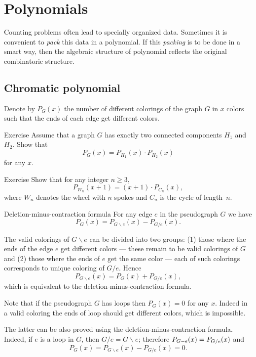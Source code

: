 \chapter{Polynomials}

Counting problems often lead to specially organized data.
Sometimes it is convenient to {}\emph{pack} this data in a polynomial.
If this {}\emph{packing} is to be done in a smart way, then the algebraic structure of polynomial reflects the original combinatoric structure.

\section*{Chromatic polynomial}

Denote by $P_G(x)$ the number of different colorings of the graph $G$ in $x$ colors such that the ends of each edge get different colors.

\begin{thm}{Exercise}
Assume that a graph $G$ has exactly two connected components $H_1$ and $H_2$.
Show that 
\[P_G(x)=P_{H_1}(x)\cdot P_{H_2}(x)\]
for any $x$.
\end{thm}

\begin{thm}{Exercise}
Show that for any integer $n\ge 3$,
\[P_{W_n}(x+1)=(x+1)\cdot P_{C_n}(x),\]
where $W_n$ denotes the wheel with $n$ spokes and $C_n$ is the cycle of length~$n$.
\end{thm}

\begin{thm}{Deletion-minus-contraction formula}\label{thm:deletion-minus-contraction}
For any edge $e$ in the pseudograph $G$ we have
\[P_G(x)=P_{G\backslash e}(x)-P_{G/e}(x).\]
\end{thm}

The valid colorings of $G\backslash e$ can be divided into two groups: 
(1) those where the ends of the edge $e$ get different colors --- these remain to be valid colorings of $G$ and (2) those where the ends of $e$ get the same color --- each of such colorings corresponds to unique coloring of $G/e$.
Hence
\[P_{G\backslash e}(x)=P_G(x)+P_{G/e}(x),\]
which is equivalent to the deletion-minus-contraction formula.
\qeds

Note that if the pseudograph $G$ has loops then $P_G(x)=0$ for any $x$.
Indeed in a valid coloring the ends of loop should get different colors, which is impossible.

The latter can be also proved using the deletion-minus-contraction formula.
Indeed, if $e$ is a loop in $G$, then $G/e=G\backslash e$;
therefore $P_{G\backslash e}(x)\z=P_{G/e}(x)$ and
\[P_G(x)=P_{G\backslash e}(x)-P_{G/e}(x) =0.\]

